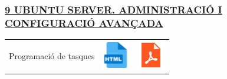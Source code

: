 \documentclass[
  12 pt,
  a4paper,
]{article}
\begin{document}
\subsubsection{\texorpdfstring{\hyperref[U9]{9 UBUNTU SERVER.
ADMINISTRACIÓ I CONFIGURACIÓ
AVANÇADA}}{9 UBUNTU SERVER. ADMINISTRACIÓ I CONFIGURACIÓ AVANÇADA}}\label{ubuntu-server.-administraciuxf3-i-configuraciuxf3-avanuxe7ada}

\begin{longtable}[]{@{}
  >{\raggedright\arraybackslash}p{}
  >{\raggedright\arraybackslash}p{}
  >{\raggedright\arraybackslash}p{}@{}}
\toprule\noalign{}
\endhead
\bottomrule\noalign{}
\endlastfoot
Programació de tasques &
\href{UD9_LINUX_AVANÇADA/U9-ProgramarTasques.html}{\includegraphics{recursos/iconohtml.png}}
&
\href{UD9_LINUX_AVANÇADA/U9-ProgramarTasques.pdf}{\includegraphics{recursos/iconopdf.png}} \\
\end{longtable}
\end{document}
